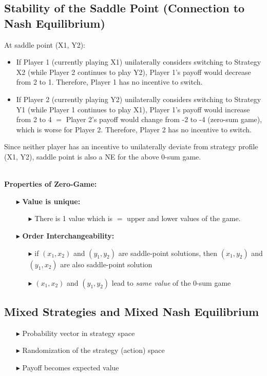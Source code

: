 \documentclass[../Main.tex]{subfiles}
\begin{document}
\subsection*{Stability of the Saddle Point (Connection to Nash Equilibrium)}{
At saddle point (X1, Y2):
\begin{itemize}
    \item If Player 1 (currently playing X1) unilaterally considers switching to Strategy X2 (while Player 2 continues to play Y2), Player 1's payoff would decrease from 2 to 1. Therefore, Player 1 has no incentive to switch.
    \item If Player 2 (currently playing Y2) unilaterally considers switching to Strategy Y1 (while Player 1 continues to play X1), Player 1's payoff would increase from 2 to 4 $=$ Player 2's payoff would change from -2 to -4 (zero-sum game), which is worse for Player 2. Therefore, Player 2 has no incentive to switch.
\end{itemize}
Since neither player has an incentive to unilaterally deviate from strategy profile (X1, Y2), saddle point is also a NE for the above 0-sum game.}\\

\textbf{Properties of Zero-Game:}
\begin{itemize}
    \item[$\blacktriangleright$] \textbf{Value is unique:}
    \begin{itemize}
        \item[$\blacktriangleright$] There is 1 value which is $=$ upper and lower values of the game.
    \end{itemize}
    \item[$\blacktriangleright$] \textbf{Order Interchangeability:}
    \begin{itemize}
        \item[$\blacktriangleright$] if $(x_1, x_2)$ and $(y_1, y_2)$ are saddle-point solutions, then $(x_1, y_2)$ and $(y_1, x_2)$ are also saddle-point solution
        \item[$\blacktriangleright$] $(x_1, x_2)$ and $(y_1, y_2)$ lead to \textit{same value} of the 0-sum game
    \end{itemize}
\end{itemize}

\subsection{Mixed Strategies and Mixed Nash Equilibrium}
\begin{itemize}
    \item[$\blacktriangleright$] Probability vector in strategy space
    \item[$\blacktriangleright$] Randomization of the strategy (action) space
    \item[$\blacktriangleright$] Payoff becomes expected value
\end{itemize}
\end{document}
